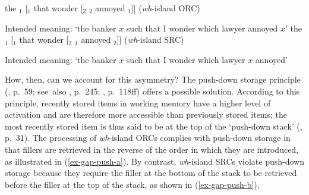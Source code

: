 \pex \label{ex-gap-islands}
\a
\ljudge*the $_1$ [$_1$ that  wonder [$_2$ $_2$ annoyed $_1$]] (\textit{wh}-island ORC)
\par\nobreak\vspace{24pt}\label{ex-gap-islands-a}
Intended meaning: `the banker $x$ such that I wonder which lawyer annoyed $x$'
\a
\ljudge*the $_1$ [$_1$ that  wonder [$_2$ $_1$ annoyed $_2$]] (\textit{wh}-island SRC)
\par\nobreak\vspace{24pt}\label{ex-gap-islands-b}
Intended meaning: `the banker $x$ such that I wonder which lawyer $x$ annoyed'
\xe 

How, then, can we account for this asymmetry? The push-down storage principle (\cite{marcus1978}, p.~59; see~also \cite{kempen.hoenkamp1987}, p.~245; \cite{ogrady2005}, p.~118ff) offers a possible solution. According to this principle, recently stored items in working memory have a higher level of activation and are therefore more accessible than previously stored items; the most recently stored item is thus said to be at the top of the `push-down stack' (\cite{marcus1978}, p.~31). The processing of \textit{wh}-island ORCs complies with push-down storage in that fillers are retrieved in the reverse of the order in which they are introduced, as illustrated in (\ref{ex-gap-push-a}). By contrast, \textit{wh}-island SRCs violate push-down storage because they require the filler at the bottom of the stack to be retrieved before the filler at the top of the stack, as shown in (\ref{ex-gap-push-b}).

